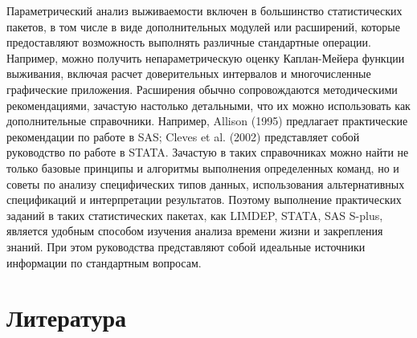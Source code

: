 \noindent
Параметрический анализ выживаемости включен в большинство статистических пакетов, в том числе в виде дополнительных модулей или расширений, которые предоставляют возможность выполнять различные стандартные операции. Например, можно получить непараметрическую оценку Каплан-Мейера функции выживания, включая расчет доверительных интервалов и многочисленные графические приложения. Расширения обычно сопровождаются методическими рекомендациями, зачастую настолько детальными, что их можно использовать как дополнительные справочники. Например, Allison (1995) предлагает практические рекомендации по работе в SAS; Cleves et al. (2002) представляет собой руководство по работе в STATA. Зачастую в таких справочниках можно найти не только базовые принципы и алгоритмы выполнения определенных команд, но и советы по анализу специфических типов данных, использования альтернативных спецификаций и интерпретации результатов. Поэтому выполнение практических заданий в таких статистических пакетах, как LIMDEP, STATA, SAS S-plus, является удобным способом изучения анализа времени жизни и закрепления знаний. При этом руководства представляют собой идеальные источники информации по стандартным вопросам.




\section{Литература}\label{sec:17.13}

